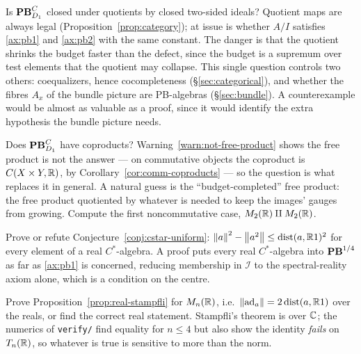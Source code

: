 \begin{problem}\label{prob:quotients}
Is $\mathbf{PB}^C_{D_1}$ closed under quotients by closed two-sided ideals?
Quotient maps are always legal (Proposition~\ref{prop:category}); at issue is
whether $A/I$ satisfies \eqref{ax:pb1} and \eqref{ax:pb2} with the same
constant.  The danger is that the quotient shrinks the budget faster than the
defect, since the budget is a supremum over test elements that the quotient may
collapse.  This single question controls two others: coequalizers, hence
cocompleteness (\S\ref{sec:categorical}), and whether the fibres $A_x$ of the
bundle picture are PB-algebras (\S\ref{sec:bundle}).  A counterexample would be
almost as valuable as a proof, since it would identify the extra hypothesis the
bundle picture needs.
\end{problem}

\begin{problem}[Coproducts]\label{prob:coproducts}
Does $\mathbf{PB}^C_{D_1}$ have coproducts?  Warning~\ref{warn:not-free-product}
shows the free product is not the answer --- on commutative objects the
coproduct is $C(X\times Y,\mathbb{R})$, by Corollary~\ref{cor:comm-coproducts} --- so
the question is what replaces it in general.  A natural guess is the
``budget-completed'' free product: the free product quotiented by whatever is
needed to keep the images' gauges from growing.  Compute the first
noncommutative case, $M_2(\mathbb{R})\amalg M_2(\mathbb{R})$.
\end{problem}

\begin{problem}\label{prob:cstar-bound}
Prove or refute Conjecture~\ref{conj:cstar-uniform}:
$\left\lVert a\right\rVert^2-\left\lVert a^2\right\rVert\le\operatorname{dist}(a,\mathbb{R}1)^2$ for every element of a real
$C^*$-algebra.  A proof puts every real $C^*$-algebra into $\mathbf{PB}^{1/4}$ as far as
\eqref{ax:pb1} is concerned, reducing membership in $\mathcal{I}$ to the
spectral-reality axiom alone, which is a condition on the centre.
\end{problem}

\begin{problem}\label{prob:real-stampfli}
Prove Proposition~\ref{prop:real-stampfli} for $M_n(\mathbb{R})$, i.e.\
$\left\lVert\operatorname{ad}_a\right\rVert=2\operatorname{dist}(a,\mathbb{R}1)$ over the reals, or find the correct real
statement.  Stampfli's theorem is over $\mathbb{C}$; the numerics of \texttt{verify/}
find equality for $n\le4$ but also show the identity \emph{fails} on
$T_n(\mathbb{R})$, so whatever is true is sensitive to more than the norm.
\end{problem}


